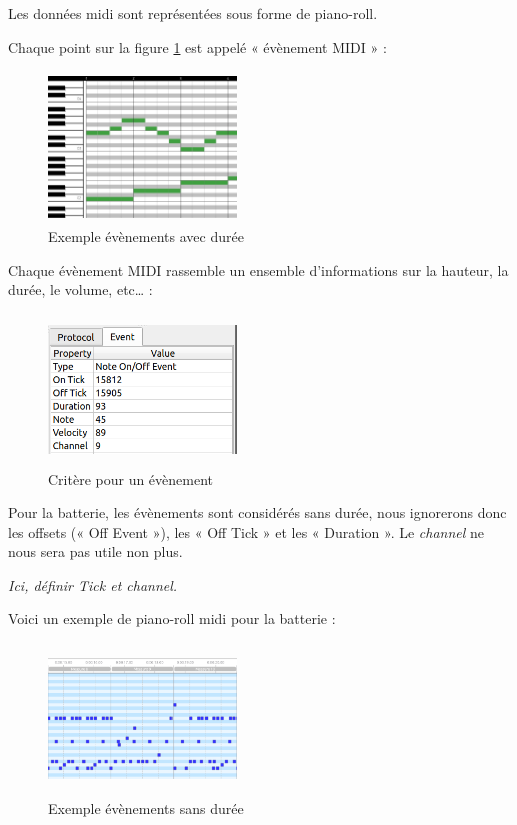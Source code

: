 Les données midi sont représentées sous forme de piano-roll. 

Chaque point sur la figure \ref{piano_roll} est appelé « évènement MIDI » :
\begin{figure}[h]
	\centering
	\includegraphics[height=40mm, width=50mm]{z_images/1_contexte/2_midi_piano.jpg}
	\caption{Exemple évènements avec durée}
	\label{piano_roll}
\end{figure}

Chaque évènement MIDI rassemble un ensemble d’informations sur la hauteur, la durée, le volume, etc… :
\begin{figure}[h]
	\centering
	\includegraphics[height=40mm, width=50mm]{z_images/1_contexte/3_evenements_midi.png}
	\caption{Critère pour un évènement}
\end{figure} %
{}

Pour la batterie, les évènements sont considérés sans durée, nous ignorerons donc les offsets (« Off Event »), les « Off Tick » et les « Duration ». 
Le \textit{channel} ne nous sera pas utile non plus.

\textit{Ici, définir Tick et channel.}

Voici un exemple de piano-roll midi pour la batterie :
\begin{figure}[h!]
	\centering
	\includegraphics[height=40mm, width=50mm]{z_images/1_contexte/4_midi_batterie.png}
	\caption{Exemple évènements sans durée}
\end{figure}

